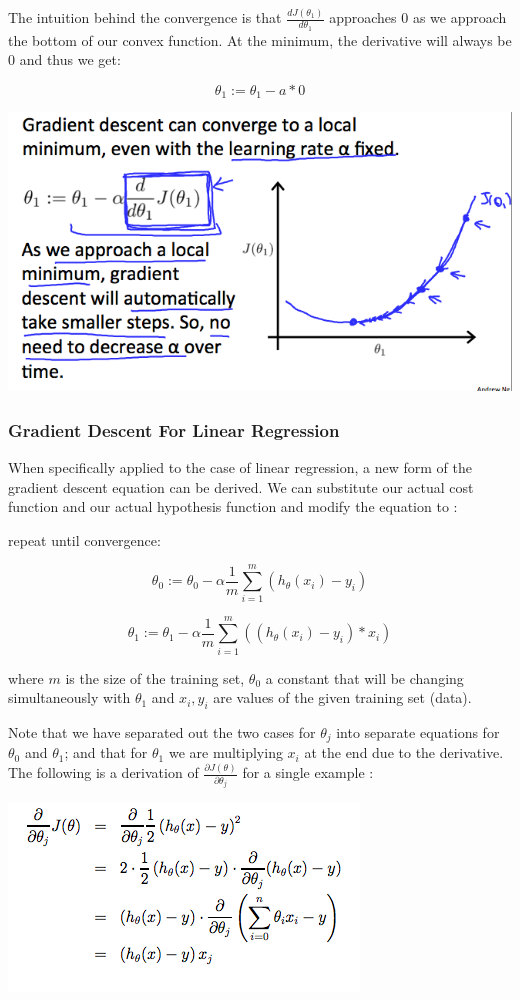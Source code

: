 \documentclass[UTF8]{article}
\begin{document}
The intuition behind the convergence is that $\frac{dJ(\theta_1)}{d\theta_1}$ approaches 0 as we approach the bottom of our convex function. At the minimum, the derivative will always be 0 and thus we get:

\[ \theta_1:=\theta_1-a*0 \]

\includegraphics[width = .8\textwidth]{NotePics/2_3_1_3.png}

\subsubsection{Gradient Descent For Linear Regression}

When specifically applied to the case of linear regression, a new form of the gradient descent equation can be derived. We can substitute our actual cost function and our actual hypothesis function and modify the equation to :

repeat until convergence:

\[ \theta_0 := \theta_0-\alpha \frac{1}{m} \sum\limits_{i=1}^{m}(h_\theta(x_{i}) - y_{i}) \]
 
\[ \theta_1 := \theta_1 - \alpha \frac{1}{m} \sum\limits_{i=1}^{m}((h_\theta(x_{i}) - y_{i}) * x_{i}) \]

where $m$ is the size of the training set, $\theta_0$ a constant that will be changing simultaneously with $\theta_1$ and $x_{i}, y_{i}$ are values of the given training set (data).

Note that we have separated out the two cases for $\theta_j$ into separate equations for $\theta_0$ and $\theta_1$; and that for $\theta_1$ we are multiplying $x_{i}$ at the end due to the derivative. The following is a derivation of $\frac{\partial J(\theta)}{\partial \theta_j}$ for a single example :

\includegraphics[width = .8\textwidth]{NotePics/2_3_2_1.png}
\end{document}
